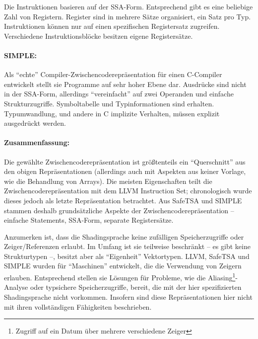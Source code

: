 \documentclass[twoside,a4paper,fleqn,12pt]{article}
\begin{document}
Die Instruktionen basieren auf der SSA-Form. Entsprechend gibt es eine beliebige Zahl von Registern.
Register sind in mehrere Sätze organisiert, ein Satz pro Typ. Instruktionen können nur auf einen
spezifischen Registersatz zugreifen. Verschiedene Instruktionsblöcke besitzen eigene Registersätze.


\paragraph{SIMPLE:} Als "`echte"' Compiler-Zwischencoderepräsentation für einen C-Compiler entwickelt
stellt sie Programme auf sehr hoher Ebene dar. Ausdrücke sind nicht in der SSA-Form, allerdings
"`vereinfacht"' auf zwei Operanden und einfache Strukturzugriffe. Symboltabelle und Typinformationen
sind erhalten. Typumwandlung, und andere in C implizite Verhalten, müssen explizit ausgedrückt werden.


\paragraph{Zusammenfassung:}
Die gewählte Zwischencoderepräsentation ist größtenteils ein "`Querschnitt"' aus den obigen Repräsentationen
(allerdings auch mit Aspekten aus keiner Vorlage, wie die Behandlung von Arrays). Die meisten Eigenschaften
teilt die Zwischencoderepräsentation mit dem LLVM Instruction Set; chronologisch wurde dieses jedoch als letzte
Repräsentation betrachtet. Aus SafeTSA und SIMPLE stammen deshalb grundsätzliche Aspekte der Zwischencoderepräsentation 
-- einfache Statements, SSA-Form, separate Registersätze.

Anzumerken ist, dass die Shadingsprache keine zufälligen Speicherzugriffe oder Zeiger/Referenzen erlaubt.
Im Umfang ist sie teilweise beschränkt -- es gibt keine Strukturtypen --, besitzt aber als "`Eigenheit"' Vektortypen.
LLVM, SafeTSA und SIMPLE wurden für "`Maschinen"' entwickelt, die die Verwendung von Zeigern erlauben. Entsprechend
stellen sie Lösungen für Probleme, wie die Aliasing\footnote{Zugriff auf ein Datum über mehrere verschiedene Zeiger}-Analyse oder typsichere Speicherzugriffe, bereit, die mit
der hier spezifizierten Shadingsprache nicht vorkommen. Insofern sind diese Repräsentationen hier nicht
mit ihren vollständigen Fähigkeiten beschrieben.
\end{document}
